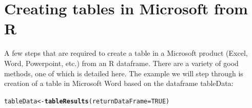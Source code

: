 \documentclass[a4paper,11pt]{article}\usepackage[]{graphicx}\usepackage[]{color}
\makeatletter
\newcommand{\hlnum}[1]{\textcolor[rgb]{0.686,0.059,0.569}{#1}}%
\newcommand{\hlstd}[1]{\textcolor[rgb]{0.345,0.345,0.345}{#1}}%
\newcommand{\hlkwb}[1]{\textcolor[rgb]{0.69,0.353,0.396}{#1}}%
\newcommand{\hlkwc}[1]{\textcolor[rgb]{0.333,0.667,0.333}{#1}}%
\newcommand{\hlkwd}[1]{\textcolor[rgb]{0.737,0.353,0.396}{\textbf{#1}}}%
\newenvironment{kframe}{%
 \def\at@end@of@kframe{}%
 \ifinner\ifhmode%
  \def\at@end@of@kframe{\end{minipage}}%
  \begin{minipage}{\columnwidth}%
 \fi\fi%
 \def\FrameCommand##1{\hskip\@totalleftmargin \hskip-\fboxsep
 \colorbox{shadecolor}{##1}\hskip-\fboxsep
     \hskip-\linewidth \hskip-\@totalleftmargin \hskip\columnwidth}%
 \MakeFramed {\advance\hsize-\width
   \@totalleftmargin\z@ \linewidth\hsize
   \@setminipage}}%
 {\par\unskip\endMakeFramed%
 \at@end@of@kframe}
\newenvironment{knitrout}{}{} %
\makeatother
\begin{document}
\section{Creating tables in Microsoft from R}
\label{app:createWordTable}
A few steps that are required to create a table in a Microsoft product (Excel, Word, Powerpoint, etc.) from an R dataframe. There are a variety of good methods, one of which is detailed here. The example we will step through is creation of a table in Microsoft Word based on the dataframe tableData:

\begin{knitrout}
\color{fgcolor}\begin{kframe}
\begin{alltt}
\hlstd{tableData} \hlkwb{<-} \hlkwd{tableResults}\hlstd{(}\hlkwc{returnDataFrame}\hlstd{=}\hlnum{TRUE}\hlstd{)}
\end{alltt}
\end{kframe}
\end{knitrout}
\end{document}
